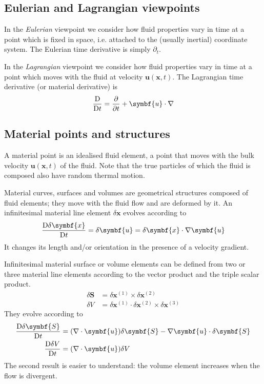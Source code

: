 \documentclass{jknotes}
\begin{document}
\subsection{Eulerian and Lagrangian viewpoints}
In the \emph{Eulerian} viewpoint we consider how fluid properties vary in time
at a point which is fixed in space, i.e. attached to the (usually inertial)
coordinate system. The Eulerian time derivative is simply $\partial_t$.

In the \emph{Lagrangian} viewpoint we consider how fluid properties vary in
time at a point which moves with the fluid at velocity
$\symbf{u}(\symbf{x},t)$. The Lagrangian time derivative (or material
derivative) is
\begin{equation}
	\frac{\diffD}{\diffD t} = \frac{\partial}{\partial t} +
	\symbf{u}\cdot\nabla
\end{equation}

\subsection{Material points and structures}
A material point is an idealised fluid element, a point that moves with the
bulk velocity $\symbf{u}(\symbf{x},t)$ of the fluid. Note that the true
particles of which the fluid is composed also have random thermal motion.

Material curves, surfaces and volumes are geometrical structures composed of
fluid elements; they move with the fluid flow and are deformed by it. An
infinitesimal material line element $\delta\symbf{x}$ evolves according to
\begin{equation}
	\frac{\diffD \delta \symbf{x}}{\diffD t} = \delta \symbf{u} =
	\delta\symbf{x}\cdot\nabla\symbf{u}
\end{equation}
It changes its length and/or orientation in the presence of a velocity
gradient.

Infinitesimal material surface or volume elements can be defined from two or
three material line elements according to the vector product and the triple
scalar product.
\begin{align}
	\delta \symbf{S} &= \delta \symbf{x}^{(1)} \times \delta \symbf{x}^{(2)} \\
	\delta V &= \delta \symbf{x}^{(1)} \cdot \delta \symbf{x}^{(2)} \times
	\delta \symbf{x}^{(3)}
\end{align}
They evolve according to
\begin{align}
	\frac{\diffD \delta \symbf{S}}{\diffD t} &= (\nabla \cdot \symbf{u})\delta
	\symbf{S} - \nabla \symbf{u} \cdot\delta \symbf{S}\\
	\frac{\diffD \delta V}{\diffD t} &= (\nabla \cdot \symbf{u})\delta V
\end{align}
The second result is easier to understand: the volume element increases when
the flow is divergent.
\end{document}
